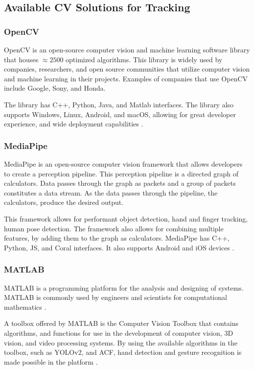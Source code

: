 \documentclass{report}
\begin{document}
\subsection{Available CV Solutions for Tracking}

\subsubsection{OpenCV}

OpenCV is an open-source computer vision and machine learning software library
that houses ${\approx2500}$ optimized algorithms. This library is widely used by
companies, researchers, and open source communities that utilize computer vision
and machine learning in their projects. Examples of companies that use OpenCV
include Google, Sony, and Honda.

The library has C++, Python, Java, and Matlab interfaces. The library also supports
Windows, Linux, Android, and macOS, allowing for great developer experience, and
wide deployment capabilities \parencite{opencv}.

\subsubsection{MediaPipe}
\label{section:rrl-mediapipe}

MediaPipe is an open-source computer vision framework that allows developers to
create a perception pipeline. This perception pipeline is a directed graph of
calculators. Data passes through the graph as packets and a group of packets
constitutes a data stream. As the data passes through the pipeline, the
calculators, produce the desired output.

This framework allows for performant object detection, hand and finger tracking,
human pose detection. The framework also allows for combining multiple features,
by adding them to the graph as calculators. MediaPipe has C++, Python, JS, and
Coral interfaces. It also supports Android and iOS devices
\parencite{mediapipe}.

\subsubsection{MATLAB}
MATLAB is a programming platform for the analysis and designing of systems.
MATLAB is commonly used by engineers and scientists for computational
mathematics \parencite{what-matlab}.

A toolbox offered by MATLAB is the Computer Vision Toolbox that contains
algorithms, and functions for use in the development of computer vision, 3D
vision, and video processing systems. By using the available algorithms in the
toolbox, such as YOLOv2, and ACF, hand detection and gesture recognition is made
possible in the platform \parencite{matlab}.
\end{document}
